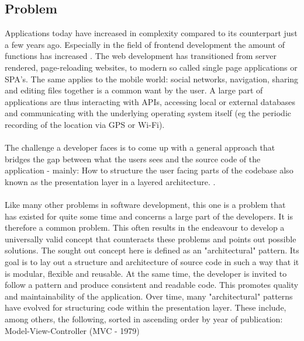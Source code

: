 \subsection{Problem}
\label{subsec:problem}

Applications today have increased in complexity compared to its counterpart just a few years ago. Especially in the field of frontend development the amount of 
functions has increased
\cite{increasingNatureOfFrontendKevinBall2018}. 
The web development has transitioned from server rendered, 
page-reloading websites, to modern so called single page applications or SPA's.
The same applies to the mobile world: social networks, navigation, sharing and editing files together is a common want by the user.
A large part of applications are thus interacting with APIs, accessing local or external databases
and communicating with the underlying operating system itself (eg the periodic recording of the location via GPS or Wi-Fi).
\\
\\
The challenge a developer faces is to come up with a general approach that bridges the gap between what the users sees and the source code of 
the application - mainly: How to structure the user facing parts of the codebase also known as the presentation layer
\cite{patternsOfEnterpriseApplicationArchitectureMartinFowlerPresentationLayer,softwareArchitecturePatternMarkRichards2015PresentationLayer} 
in a layered architecture.
\cite{threeTierArchitectureDonaldWolfe2013}.
\\
\\
Like many other problems in software development, this one is a problem that has existed for quite some time and concerns a large part of the developers.
It is therefore a common problem. This often results in the endeavour to develop a universally valid concept that counteracts these problems and points out 
possible solutions. The sought out concept here is defined as an "architectural" pattern.
\cite{softwareArchitecturePatternMarkRichards2015, patternOrientedSoftwareArchitectureFrankBuschmann2007, designPatternElementsOfErichGamma2000}
Its goal is to lay out a structure and architecture of source code in such a way that it is modular, flexible and
reusable. At the same time, the developer is invited to follow a pattern and produce consistent and readable code. This promotes quality and
maintainability of the application. Over time, many "architectural" patterns have evolved for structuring code within the presentation layer. 
These include, among others, the following, sorted in ascending order by year of publication: Model-View-Controller (MVC - 1979) 
